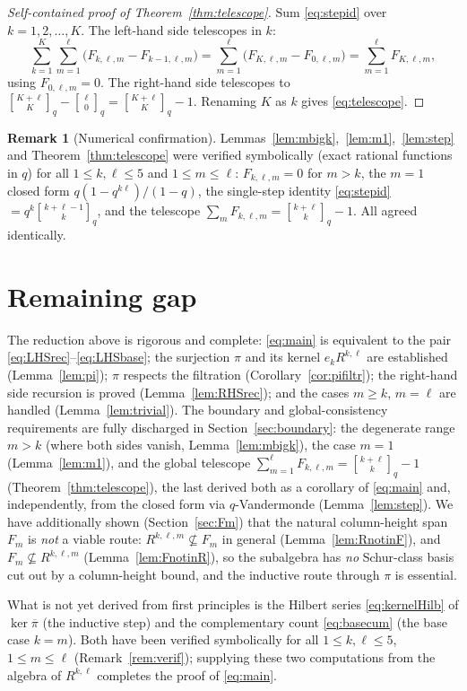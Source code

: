 \documentclass{amsart}
\theoremstyle{definition}
\newtheorem{remark}{Remark}
\newcommand{\qbin}[2]{\genfrac{[}{]}{0pt}{}{#1}{#2}_q}
\newcommand{\rkl}{R^{k,\ell}}
\newcommand{\Rklm}{R^{k,\ell,m}}
\begin{document}
\begin{proof}[Self-contained proof of Theorem~\ref{thm:telescope}]
Sum \eqref{eq:stepid} over $k=1,2,\dots,K$. The left-hand side telescopes in $k$:
\[
\sum_{k=1}^{K}\sum_{m=1}^{\ell}\big(F_{k,\ell,m}-F_{k-1,\ell,m}\big)
=\sum_{m=1}^{\ell}\big(F_{K,\ell,m}-F_{0,\ell,m}\big)
=\sum_{m=1}^{\ell}F_{K,\ell,m},
\]
using $F_{0,\ell,m}=0$. The right-hand side telescopes to
$\qbin{K+\ell}{K}-\qbin{\ell}{0}=\qbin{K+\ell}{K}-1$. Renaming $K$ as $k$ gives
\eqref{eq:telescope}.
\end{proof}

\begin{remark}[Numerical confirmation]\label{rem:telnum}
Lemmas~\ref{lem:mbigk},~\ref{lem:m1},~\ref{lem:step} and
Theorem~\ref{thm:telescope} were verified symbolically (exact rational functions in
$q$) for all $1\le k,\ell\le5$ and $1\le m\le\ell$: $F_{k,\ell,m}=0$ for $m>k$, the
$m=1$ closed form $q(1-q^{k\ell})/(1-q)$, the single-step identity \eqref{eq:stepid}
$=q^k\qbin{k+\ell-1}{k}$, and the telescope $\sum_m F_{k,\ell,m}=\qbin{k+\ell}{k}-1$.
All agreed identically.
\end{remark}

\section*{Remaining gap}

The reduction above is rigorous and complete: \eqref{eq:main} is equivalent to the
pair \eqref{eq:LHSrec}--\eqref{eq:LHSbase}; the surjection $\pi$ and its kernel
$e_k\rkl$ are established (Lemma~\ref{lem:pi}); $\pi$ respects the filtration
(Corollary~\ref{cor:pifiltr}); the right-hand side recursion is proved
(Lemma~\ref{lem:RHSrec}); and the cases $m\ge k$, $m=\ell$ are handled
(Lemma~\ref{lem:trivial}). The boundary and global-consistency requirements are
fully discharged in Section~\ref{sec:boundary}: the degenerate range $m>k$ (where
both sides vanish, Lemma~\ref{lem:mbigk}), the case $m=1$
(Lemma~\ref{lem:m1}), and the global telescope
$\sum_{m=1}^{\ell}F_{k,\ell,m}=\qbin{k+\ell}{k}-1$
(Theorem~\ref{thm:telescope}), the last derived both as a corollary of
\eqref{eq:main} and, independently, from the closed form via $q$-Vandermonde
(Lemma~\ref{lem:step}). We have additionally shown
(Section~\ref{sec:Fm}) that the natural column-height span $F_m$ is \emph{not} a
viable route: $\Rklm\not\subseteq F_m$ in general (Lemma~\ref{lem:RnotinF}), and $F_m\not\subseteq\Rklm$ (Lemma~\ref{lem:FnotinR}), so the
subalgebra has \emph{no} Schur-class basis cut out by a column-height bound, and the
inductive route through $\pi$ is essential.

What is not yet derived from first principles is the
Hilbert series \eqref{eq:kernelHilb} of $\ker\overline\pi$ (the inductive step) and
the complementary count \eqref{eq:basecum} (the base case $k=m$). Both have been
verified symbolically for all $1\le k,\ell\le5$, $1\le m\le\ell$
(Remark~\ref{rem:verif}); supplying these two computations from the algebra of
$\rkl$ completes the proof of \eqref{eq:main}.
\end{document}
